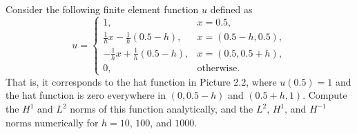 \begin{exercise}
    Consider the following finite element function $u$ defined as
    \begin{equation*}
        u =
        \begin{cases}
            1, & x = 0.5, \\
            \frac{1}{h} x - \frac{1}{h} (0.5 - h), & x = (0.5 - h, 0.5), \\
            -\frac{1}{h} x + \frac{1}{h} (0.5 - h), & x = (0.5, 0.5 + h), \\
            0, & \text{otherwise}.
        \end{cases}
    \end{equation*}
    That is, it corresponds to the hat function in Picture 2.2, where $u(0.5) = 1$ and the hat function is zero everywhere in $(0, 0.5 - h)$ and $(0.5 + h, 1)$.
    Compute the $H^1$ and $L^2$ norms of this function analytically, and the $L^2$, $H^1$, and $H^{-1}$ norms numerically for $h = 10$, $100$, and $1000$.
\end{exercise}

